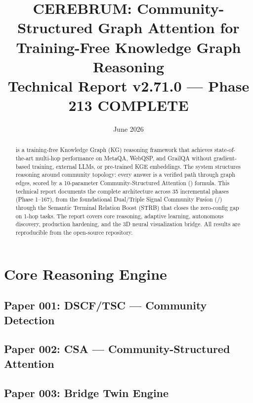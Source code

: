 \documentclass[12pt,a4paper]{article}
\title{
  \textbf{CEREBRUM: Community-Structured Graph Attention for\\
  Training-Free Knowledge Graph Reasoning} \\[0.5em]
  \large Technical Report v2.71.0 — Phase 213 COMPLETE
}
\date{June 2026}
\begin{document}
\maketitle
\thispagestyle{empty}

\begin{abstract}
\CEREBRUM{} is a training-free Knowledge Graph (KG) reasoning framework that
achieves state-of-the-art multi-hop performance on MetaQA, WebQSP, and GrailQA
without gradient-based training, external LLMs, or pre-trained KGE embeddings.
The system structures reasoning around community topology: every answer is a
verified path through graph edges, scored by a 10-parameter Community-Structured
Attention (\CSA{}) formula. This technical report documents the complete
architecture across 35 incremental phases (Phase 1–167), from the foundational
Dual/Triple Signal Community Fusion (\DSCF{}/\TSC{}) through the
Semantic Terminal Relation Boost (\textsc{STRB}) that closes the zero-config gap
on 1-hop tasks. The report covers core reasoning, adaptive learning, autonomous
discovery, production hardening, and the 3D neural visualization bridge.
All results are reproducible from the open-source repository.
\end{abstract}

\newpage
\tableofcontents
\newpage

\part{Core Reasoning Engine}

\chapter*{Paper 001: DSCF/TSC — Community Detection}


\chapter*{Paper 002: CSA — Community-Structured Attention}


\chapter*{Paper 003: Bridge Twin Engine}

\end{document}
